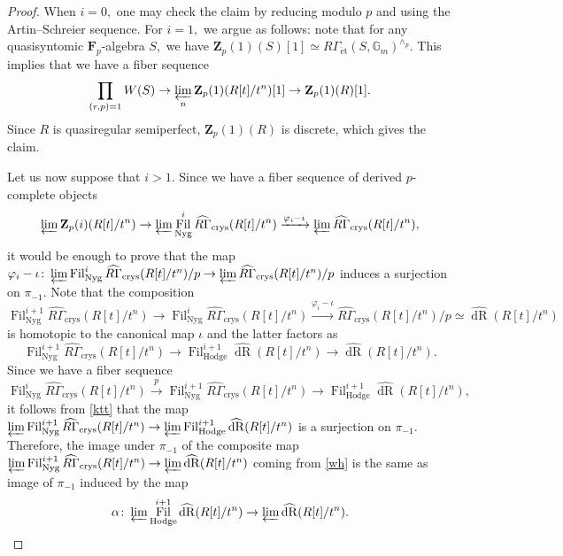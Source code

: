 \documentclass[10pt,letterpaper]{amsart}
\numberwithin{figure}{section}
\numberwithin{equation}{section}
\theoremstyle{definition}
\theoremstyle{definition}
\theoremstyle{definition}
\theoremstyle{definition}
\DeclareMathOperator{\Fil}{Fil}
\DeclareMathOperator{\dR}{dR}
\newcommand{\Z}{\mathbf{Z}}
\newcommand{\F}{\mathbf{F}}
\begin{document}
\begin{proof}
When $i=0,$ one may check the claim by reducing modulo $p$ and using the Artin--Schreier sequence. For $i=1,$ we argue as follows: note that for any quasisyntomic $\F_p$-algebra $S,$ we have $\Z_p(1) (S)[1]\simeq R\Gamma_{\mathrm{\acute{e}t}} (S, \mathbb G_m)^{\wedge_p}.$ This implies that we have a fiber sequence $$ \prod_{(r,p)=1} W(S) \to \varprojlim_n \Z_p(1) (R[t]/t^n)[1] \to \Z_p(1) (R)[1].$$Since $R$ is quasiregular semiperfect, $\Z_p(1) (R)$ is discrete, which gives the claim.





Let us now suppose that $i>1.$
  Since we have a fiber sequence of derived $p$-complete objects
$$ \varprojlim \Z_p(i) (R[t]/t^n) \to \varprojlim \Fil_{\mathrm{Nyg}}^{i} \widehat{R\Gamma}_{\mathrm{crys}}(R[t]/t^n) \xrightarrow{\varphi_i - \iota}  \varprojlim  \widehat{R\Gamma}_{\mathrm{crys}}(R[t]/t^n),$$ it would be enough to prove that the map 
${\varphi_i - \iota} \colon \varprojlim \Fil_{\mathrm{Nyg}}^{i} \widehat{R\Gamma}_{\mathrm{crys}}(R[t]/t^n)/p \to \varprojlim  \widehat{R\Gamma}_{\mathrm{crys}}(R[t]/t^n)/p$ induces a surjection on $\pi_{-1}.$ Note that the composition
$$  \Fil_{\mathrm{Nyg}}^{i+1} \widehat{R\Gamma}_{\mathrm{crys}}(R[t]/t^n) \to  \Fil_{\mathrm{Nyg}}^{i} \widehat{R\Gamma}_{\mathrm{crys}}(R[t]/t^n) \xrightarrow{\varphi_i - \iota}  \widehat{R\Gamma}_{\mathrm{crys}}(R[t]/t^n)/p \simeq  \widehat{\dR} (R[t]/t^n)$$ is homotopic to the canonical map $\iota$ and the latter factors as 
\begin{equation}\label{wh}
   \Fil_{\mathrm{Nyg}}^{i+1} \widehat{R\Gamma}_{\mathrm{crys}}(R[t]/t^n) \to \Fil^{i+1}_{\mathrm{Hodge}} \widehat{\dR}(R[t]/t^n) \to  \widehat{\dR}(R[t]/t^n).  
\end{equation}{}
Since we have a fiber sequence
$$ \Fil_{\mathrm{Nyg}}^{i} \widehat{R\Gamma}_{\mathrm{crys}}(R[t]/t^n)  \xrightarrow{p} \Fil_{\mathrm{Nyg}}^{i+1} \widehat{R\Gamma}_{\mathrm{crys}}(R[t]/t^n)  \to \Fil^{i+1}_{\mathrm{Hodge}} \widehat{\dR}(R[t]/t^n),$$it follows from \cref{ktt} that the map $\varprojlim \Fil_{\mathrm{Nyg}}^{i+1} \widehat{R\Gamma}_{\mathrm{crys}}(R[t]/t^n) \to \varprojlim \Fil^{i+1}_{\mathrm{Hodge}} \widehat{\dR}(R[t]/t^n)$ is a surjection on $\pi_{-1}.$ Therefore, the image under $\pi_{-1}$ of the composite map $\varprojlim \Fil_{\mathrm{Nyg}}^{i+1} \widehat{R\Gamma}_{\mathrm{crys}}(R[t]/t^n)  \to \varprojlim \widehat{\dR}(R[t]/t^n)$  coming from \cref{wh} is the same as image of $\pi_{-1}$ induced by the map $$\alpha\colon \varprojlim \Fil^{i+1}_{\mathrm{Hodge}} \widehat{\dR}(R[t]/t^n) \to \varprojlim  \widehat{\dR}(R[t]/t^n).$$


\end{proof}
\end{document}
